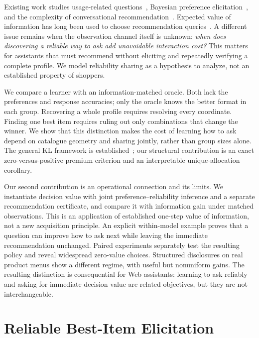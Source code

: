 \documentclass[sigconf,anonymous,review]{acmart}
\begin{document}
Existing work studies usage-related questions~\cite{kostric2021}, Bayesian preference elicitation~\cite{guo2010}, and the complexity of conversational recommendation~\cite{dinoia2022}. Expected value of information has long been used to choose recommendation queries~\cite{boutilier2003active}. A different issue remains when the observation channel itself is unknown: \emph{when does discovering a reliable way to ask add unavoidable interaction cost?} This matters for assistants that must recommend without eliciting and repeatedly verifying a complete profile. We model reliability sharing as a hypothesis to analyze, not an established property of shoppers.

We compare a learner with an information-matched oracle. Both lack the preferences and response accuracies; only the oracle knows the better format in each group. Recovering a whole profile requires resolving every coordinate. Finding one best item requires ruling out only combinations that change the winner. We show that this distinction makes the cost of learning how to ask depend on catalogue geometry and sharing jointly, rather than group sizes alone. The general KL framework is established~\cite{garivier2016,deshmukh2019}; our structural contribution is an exact zero-versus-positive premium criterion and an interpretable unique-allocation corollary.

Our second contribution is an operational connection and its limits. We instantiate decision value with joint preference--reliability inference and a separate recommendation certificate, and compare it with information gain under matched observations. This is an application of established one-step value of information, not a new acquisition principle. An explicit within-model example proves that a question can improve how to ask next while leaving the immediate recommendation unchanged. Paired experiments separately test the resulting policy and reveal widespread zero-value choices. Structured disclosures on real product menus show a different regime, with useful but nonuniform gains. The resulting distinction is consequential for Web assistants: learning to ask reliably and asking for immediate decision value are related objectives, but they are not interchangeable.

\section{Reliable Best-Item Elicitation}
\end{document}
